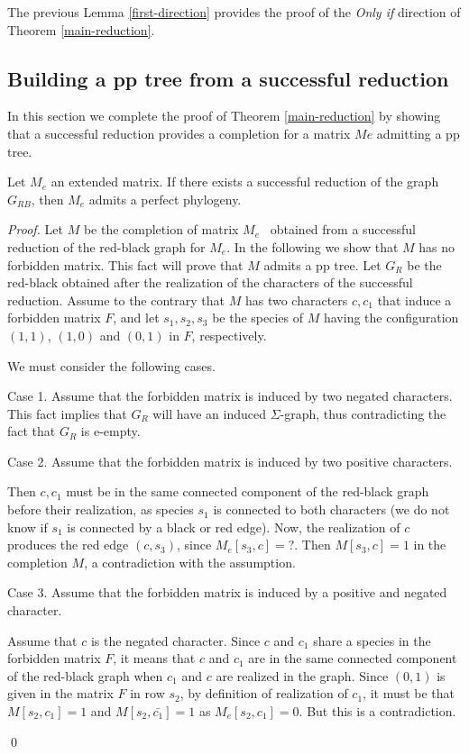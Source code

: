 \documentclass{llncs}
\newcommand{\me}{{$M_e$} }
\begin{document}
The previous Lemma \ref{first-direction} provides the proof of the {\em Only if} direction of Theorem \ref{main-reduction}.

\subsection{Building a pp tree from a successful reduction}

In this section we complete the proof of Theorem \ref{main-reduction}  by showing that  a successful reduction provides a completion for a matrix $Me$ admitting a pp tree.


\begin{theorem}
Let $M_e$ an extended matrix. If there exists a successful reduction of the graph $G_{RB}$, then $M_e$ admits a perfect phylogeny.
\end{theorem}


\begin{proof}

Let   $M$ be the completion of matrix \me\ obtained from a successful reduction of the red-black graph for $M_e$.  
In the following we show that $M$ has no forbidden matrix. This fact will prove that $M$ admits a pp tree.
Let $G_R$ be the red-black obtained after the realization of the characters of the successful reduction.
 Assume to the contrary that $M$ has two characters $c, c_1$ that induce a forbidden matrix $F$, and let $s_1, s_2, s_3$ be the species of $M$  having the configuration $(1,1)$, $(1,0)$ and $(0,1)$ in $F$, respectively.
 
We must consider the following cases.

Case 1. Assume that the forbidden matrix is induced by   two negated characters.
This fact implies that $G_R$ will have an induced $\Sigma$-graph, thus contradicting the fact that $G_R$ is e-empty.

Case 2. Assume that the forbidden matrix is induced by two positive characters.

 Then  $c, c_1$ must be in the same connected component of the  red-black graph before their realization, as species  $s_1$ is connected to both characters (we do not know if $s_1$ is connected  by a black or red edge).
 Now, the realization of $c$ produces the red edge $(c,s_3)$,  since $M_e[s_3,c] = ?$. Then $M[s_3,c]=1$ in the completion  $M$, a contradiction with the assumption.
 
 Case 3. Assume that the forbidden matrix is induced by a positive and negated character.

Assume that $c$ is the negated character.  Since $c$ and $c_1$ share a species in the forbidden matrix $F$, it means that $c$ and $c_1$ are in the same connected component of the red-black graph  when $c_1$  and $c$ are realized in the graph. Since $(0,1)$ is given in the matrix $F$ in row $s_2$, by definition of realization of $c_1$, it must be that  $M[s_2, c_1]=1$ and $M[s_2,\bar{c_1}]= 1$ as $M_e[s_2,c_1]=0$. But this  is a contradiction.




\qed
\end{proof}
\end{document}
